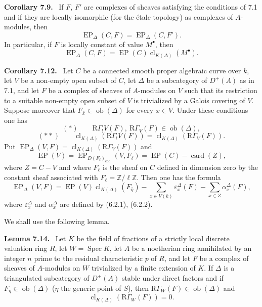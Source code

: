 \documentclass[11pt]{article}
\newenvironment{statement}[1]{\par\medskip\noindent\textbf{#1.}\ }{\par\medskip}
\DeclareMathOperator{\Spec}{Spec}
\providecommand{\EP}{\operatorname{EP}}
\providecommand{\coh}{\mathrm{coh}}
\providecommand{\Ob}{\operatorname{ob}}
\providecommand{\Ob}{\operatorname{ob}}
\providecommand{\Spec}{\operatorname{Spec}}
\providecommand{\EP}{\operatorname{EP}}
\providecommand{\Spec}{\operatorname{Spec}}
\providecommand{\Ob}{\operatorname{Ob}}
\providecommand{\coh}{\mathrm{coh}}
\providecommand{\clK}[1]{\operatorname{cl}_{K(#1)}}
\providecommand{\RG}{\mathrm R\Gamma}
\begin{document}
\begin{statement}{Corollary 7.9}
If $F$, $F'$ are complexes of sheaves satisfying the conditions of 7.1 and if they are locally isomorphic (for the étale topology) as complexes of $A$-modules, then
\[
\EP_\Delta(C,F)=\EP_\Delta(C,F').
\tag{7.10}
\]
In particular, if $F$ is locally constant of value $M^\bullet$, then
\[
\EP_\Delta(C,F)=\EP(C)\clK{\Delta}(M^\bullet).
\tag{7.11}
\]
\end{statement}

\begin{statement}{Corollary 7.12}
Let $C$ be a connected smooth proper algebraic curve over $k$, let $V$ be a non-empty open subset of $C$, let $\Delta$ be a subcategory of $D^+(A)$ as in 7.1, and let $F$ be a complex of sheaves of $A$-modules on $V$ such that its restriction to a suitable non-empty open subset of $V$ is trivialized by a Galois covering of $V$. Suppose moreover that $F_{\bar x}\in\Ob(\Delta)$ for every $x\in V$. Under these conditions one has
\[
(*)\qquad \RG_!V(F),\ \RG_V(F)\in\Ob(\Delta),
\]
\[
(**)\qquad
\clK{\Delta}(\RG_!V(F))=\clK{\Delta}(\RG_V(F)).
\]
Put $\EP_\Delta(V,F)=\clK{\Delta}(\RG_V(F))$ and
\[
\EP(V)=\EP_{D(F_\ell)_{\coh}}(V,F_\ell)=\EP(C)-\operatorname{card}(Z),
\]
where $Z=C-V$ and where $F_\ell$ is the sheaf on $C$ defined in dimension zero by the constant sheaf associated with $F_\ell=\mathbb Z/\ell\mathbb Z$. Then one has the formula
\[
\EP_\Delta(V,F)
=
\EP(V)\clK{\Delta}(F_{\bar\eta})
-\sum_{x\in V(k)}\varepsilon_x^\Delta(F)
-\sum_{x\in Z}\alpha_x^\Delta(F),
\tag{7.13}
\]
where $\varepsilon_x^\Delta$ and $\alpha_x^\Delta$ are defined by (6.2.1), (6.2.2).
\end{statement}

We shall use the following lemma.

\begin{statement}{Lemma 7.14}
Let $K$ be the field of fractions of a strictly local discrete valuation ring $R$, let $W=\Spec K$, let $A$ be a noetherian ring annihilated by an integer $n$ prime to the residual characteristic $p$ of $R$, and let $F$ be a complex of sheaves of $A$-modules on $W$ trivialized by a finite extension of $K$. If $\Delta$ is a triangulated subcategory of $D^+(A)$ stable under direct factors and if $F_{\bar\eta}\in\Ob(\Delta)$ ($\eta$ the generic point of $S$), then $\RG_W(F)\in\Ob(\Delta)$ and
\[
\clK{\Delta}(\RG_W(F))=0.
\]
\end{statement}
\end{document}
